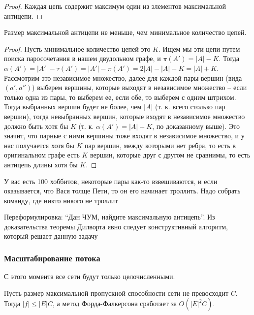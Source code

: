 \begin{proof}
    Каждая цепь содержит максимум один из элементов максимальной антицепи.
\end{proof}

\begin{proposition}
    Размер максимальной антицепи не меньше, чем минимальное количество цепей.
\end{proposition}

\begin{proof}
    Пусть минимальное количество цепей это $K$. Ищем мы эти цепи путем поиска паросочетания в нашем двудольном графе, и $\pi(A') = |A| - K$. Тогда $\alpha(A') = |A'| - \tau(A') = |A'| - \pi(A') = 2|A| - |A| + K = |A| + K$. Рассмотрим это независимое множество, далее для каждой пары вершин (вида $(a', a'')$) выберем вершины, которые выходят в независимое множество -- если только одна из пары, то выберем ее, если обе, то выберем с одним штрихом. Тогда выбранных вершин будет не более, чем $|A|$ (т. к. всего столько пар вершин), тогда невыбранных вершин, которые входят в независимое множество должно быть хотя бы $K$ (т. к. $\alpha(A') = |A| + K$, по доказанному выше). Это значит, что парные с ними вершины тоже входят в независимое множество, и у нас получается хотя бы $K$ пар вершин, между которыми нет ребра, то есть в оригинальном графе есть $K$ вершин, которые друг с другом не сравнимы, то есть антицепь длины хотя бы $K$.
\end{proof}

\begin{problem}
    У вас есть 100 хоббитов, некоторые пары как-то взвешиваются, и если оказывается, что Вася толще Пети, то он его начинает троллить. Надо собрать команду, где никто никого не троллит
\end{problem}

\begin{solution}
    Переформулировка: ``Дан ЧУМ, найдите максимальную антицепь''. Из доказательства теоремы Дилворта явно следует конструктивный алгоритм, который решает данную задачу
\end{solution}

\subsubsection{Масштабирование потока}

\noindent С этого момента все сети будут только целочисленными.

\begin{note}
    Пусть размер максимальной пропускной способности сети не превосходит $C$. Тогда $|f| \leq |E|C$, а метод Форда-Фалкерсона сработает за $O(|E|^2C)$.
\end{note}

